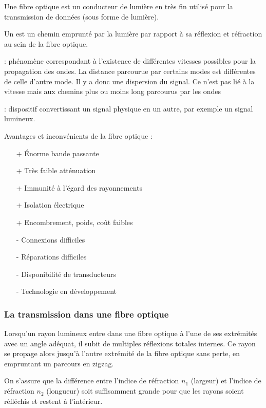 Une fibre optique est un conducteur de lumière en  très fin utilisé pour la transmission de données (sous forme de lumière).

Un  est un chemin emprunté par la lumière par rapport à sa réflexion et réfraction au sein de la fibre optique.

 : phénomène correspondant à l'existence de différentes vitesses possibles pour la propagation des ondes. La distance parcourue par certains modes est différentes de celle d'autre mode. Il y a donc une dispersion du signal. Ce n'est pas lié à la vitesse mais aux chemins plus ou moins long parcourus par les ondes

 : dispositif convertissant un signal physique en un autre, par exemple un signal lumineux.

Avantages et inconvénients de la fibre optique :
\begin{itemize}
	\item[+] Énorme bande passante
	\item[+] Très faible atténuation
	\item[+] Immunité à l'égard des rayonnements
	\item[+] Isolation électrique
	\item[+] Encombrement, poids, coût faibles
	\item[-] Connexions difficiles
	\item[-] Réparations difficiles
	\item[-] Disponibilité de transducteurs
	\item[-] Technologie en développement
\end{itemize}

\newpage
\subsubsection{La transmission dans une fibre optique}

Lorsqu'un rayon lumineux entre dans une fibre optique à l'une de ses extrémités avec un angle adéquat, il subit de multiples réflexions totales internes. Ce rayon se propage alors jusqu'à l'autre extrémité de la fibre optique sans perte, en empruntant un parcours en zigzag.

On s'assure que la différence entre l'indice de réfraction $n_1$ (largeur) et l'indice de réfraction $n_2$ (longueur) soit suffisamment grande pour que les rayons soient réfléchis et restent à l'intérieur.


